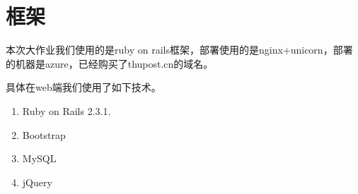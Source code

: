 \section{框架}
本次大作业我们使用的是ruby on rails框架，部署使用的是nginx+unicorn，部署的机器是azure，已经购买了thupost.cn的域名。

具体在web端我们使用了如下技术。

\begin{enumerate}
    \item Ruby on Rails 2.3.1.
    \item Bootstrap
    \item MySQL
    \item jQuery
\end{enumerate}


